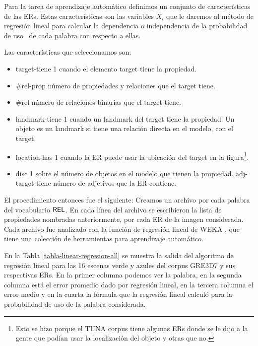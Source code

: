 Para la tarea de aprendizaje autom\'atico definimos un conjunto de caracter\'isticas de las ERs. Estas caracter\'isticas son las variables $X_i$ que le daremos al m\'etodo de regresi\'on lineal para calcular la dependencia o independencia de la probabilidad de uso \puse\ de cada palabra con respecto a ellas.

Las caracter\'isticas que seleccionamos son:

\begin{itemize}
\item target-tiene 1 cuando el elemento target tiene la propiedad. 
\item \#rel-prop  n\'umero de propiedades y relaciones que el target tiene.
\item \#rel  n\'umero de relaciones binarias que el target tiene. 
\item landmark-tiene 1 cuando un landmark del target tiene la propiedad. Un objeto es un landmark si tiene una relaci\'on directa en el modelo, con el target.
\item location-has 1 cuando la ER puede usar la ubicaci\'on del target en la figura\footnote{Esto se hizo porque el TUNA corpus tiene algunas ERs donde se le dijo a la gente que pod\'ian usar la localizaci\'on del objeto y otras que no.}.
\item disc 1 sobre el n\'umero de objetos en el modelo que tienen la propiedad.  
adj-target-tiene n\'umero de adjetivos que la ER contiene.
\end{itemize}

El procedimiento entonces fue el siguiente:
Creamos un archivo por cada palabra del vocabulario $\textsf{REL}$. En cada l\'inea del archivo 
se escribieron la lista de propiedades nombradas anteriormente, por cada ER de la imagen considerada. Cada archivo fue analizado con la funci\'on de regresi\'on lineal de WEKA \cite{Hall:WEK09}, que tiene una colecci\'on de herramientas para aprendizaje autom\'atico.

En la Tabla \ref{tabla-linear-regresion-all} se muestra la salida del algoritmo de regresi\'on lineal para las 16 escenas verde y azules del corpus GRE3D7 y sus respectivas ERs. En la primer columna podemos ver la palabra, 
en la segunda columna est\'a el error promedio dado por regresi\'on lineal, en la tercera columna el error medio 
y en la cuarta la f\'ormula que la regresi\'on lineal calcul\'o para la probabilidad de uso de la palabra considerada.

